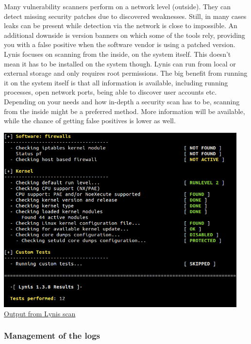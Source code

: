 Many vulnerability scanners perform on a network level (outside). They can detect missing security patches due to discovered weaknesses. Still, in many cases leaks can be present while detection via the network is close to impossible. An additional downside is version banners on which some of the tools rely, providing you with a false positive when the software vendor is using a patched version. 
\\

Lynis focuses on scanning from the inside, on the system itself. This doesn’t mean it has to be installed on the system though. Lynis can run from local or external storage and only requires root permissions. The big benefit from running it on the system itself is that all information is available, including running processes, open network ports, being able to discover user accounts etc.
\\

Depending on your needs and how in-depth a security scan has to be, scanning from the inside might be a preferred method. More information will be available, while the chance of getting false positives is lower as well.

\begin{center}
\includegraphics[width=0.95\textwidth]{images/lynis-example.png}
\\
\underline{Output from Lynis scan}
\end{center}

\pagebreak

\subsubsection{Management of the logs}

